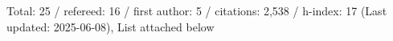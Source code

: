 Total: 25 / refereed: 16 / first author: 5 / citations: 2,538 / h-index: 17 (Last updated: 2025-06-08), List attached below